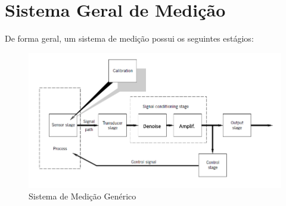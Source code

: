 \documentclass{article}
\begin{document}
    \newpage

    \section*{Sistema Geral de Medição}
        De forma geral, um sistema de medição possui os seguintes estágios:
        \begin{figure}[h]
            \centering
            \includegraphics[width=.7\textwidth]{imgs/sis_med_geral.png}
            \caption{Sistema de Medição Genérico}
        \end{figure}
\end{document}
